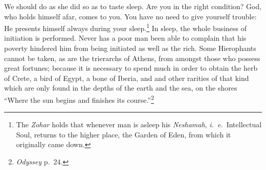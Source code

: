 \documentclass[12pt]{article}
\begin{document}
\noindent We should do as she did so as to taste sleep. Are you in the right
condition?  God, who holds himself afar, comes to you. You have no need to give
yourself trouble: He presents himself always during your sleep.\footnote{The
\textit{Zohar} holds that whenever man is asleep his \textit{Neshamah},
\textit{i.~e.}~Intellectual Soul, returns to the higher place, the Garden of
Eden, from which it originally came down.} In sleep, the whole business of
initiation is performed. Never has a poor man been able to complain that his
poverty hindered him from being initiated as well as the rich. Some Hierophants
cannot be taken, as are the trierarchs of Athens, from amongst those who
possess great fortunes; because it is necessary to spend much in order to
obtain the herb of Crete, a bird of Egypt, a bone of Iberia, and and other
rarities of that kind which are only found in the depths of the earth and the
sea, on the shores ``Where the sun begins and finishes its
course.''\footnote{\textit{Odyssey} p.~24.}
\end{document}
